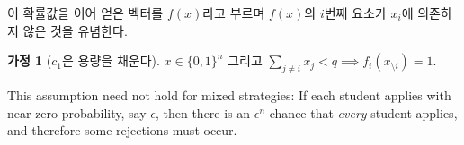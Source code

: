 \documentclass[12pt]{article} %
\newif\ifEN
\theoremstyle{definition}
\newtheorem{assumption}{Assumption}
\theoremstyle{definition}
\newtheorem{assumption}{가정}
\begin{document}
\ifEN {
We will use the vector $f(x)$ to denote the concatenation of these probabilities, with the understanding that the $i$th entry of $f(x)$ does not depend on $x_i$. %
\begin{assumption}[$c_1$ fills capacity] \label{c1fillcap}
$x \in \{0, 1\}^n$ and $\sum_{j\neq i} x_{j} < q \implies f_i(x_{\setminus i}) = 1$.
\end{assumption}
This assumption need not hold for mixed strategies: If each student applies with near-zero probability, say $\epsilon$, then there is an $\epsilon^n$ chance that \emph{every} student applies, and some rejections must occur.  
} \else {
이 확률값을 이어 얻은 벡터를 $f(x)$라고 부르며 $f(x)$의 $i$번째 요소가 $x_i$에 의존하지 않은 것을 유념한다. %
\begin{assumption}[$c_1$은 용량을 채운다] \label{c1fillcap}
$x \in \{0, 1\}^n$ 그리고 $\sum_{j\neq i} x_{j} < q \implies f_i(x_{\setminus i}) = 1$.
\end{assumption}
This assumption need not hold for mixed strategies: If each student applies with near-zero probability, say $\epsilon$, then there is an $\epsilon^n$ chance that \emph{every} student applies, and therefore some rejections must occur. 
} \fi
\end{document}
